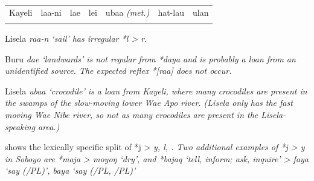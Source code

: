 \begin{table}
\begin{threeparttable}
\begin{tabular}{lllllll}
Kayeli	&	{\hr}laa-ni	&	{\hr}lae	&	{\hr}lei	&	{\hr}ubaa \it{(met.)}	&	{\hr}hat-lau	&	{\hr}ulan\\
		\lspbottomrule
	\end{tabular}
		\begin{tablenotes}\tnsize
			\item[†]	{Lisela \it{raa-n} ‘sail’ has irregular *l > \it{r}.}
			\item[‡]	{Buru \it{dae} ‘landwards’ is not regular from *daya
								and is probably a loan from an unidentified source.
								The expected reflex *[raa] does not occur.}
			\item[Δ] {Lisela \it{ubaa} `crocodile' is a loan from Kayeli,
								where many crocodiles are present in the swamps
								of the slow-moving lower Wae Apo river.
								(Lisela only has the fast moving Wae Nibe river,
								so not as many crocodiles are present in the
								Lisela-speaking area.)}
		\end{tablenotes}
	\end{threeparttable}
\end{table}

 shows the lexically specific split of *j > \it{y, l}, {\0}.
Two additional examples of *j > \it{y} in Soboyo are *maja >
\it{moyoŋ} ‘dry’, and *bajaq ‘tell, inform; ask,
inquire’ > \it{faya} ‘say (/PL)’,
\it{baya} ‘say (/PL, /PL)’


